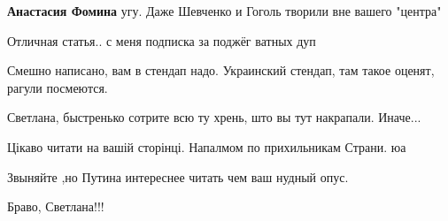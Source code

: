 \begin{itemize}
\begin{itemize}
\textbf{Анастасия Фомина} угу. Даже Шевченко и Гоголь творили вне вашего "центра"
\end{itemize}

 
Отличная статья.. с меня подписка за поджёг ватных дуп

 
Смешно написано, вам в стендап надо. Украинский стендап, там такое оценят, рагули посмеются.

 
Светлана, быстренько сотрите всю ту хрень, што вы тут накрапали. Иначе...

 

Цікаво читати на вашій сторінці.
Напалмом по прихильникам Страни. юа

 
Звыняйте ,но Путина интереснее читать чем ваш нудный опус.

 
Браво, Светлана!!!👏🏻👏🏻👏🏻


\end{itemize}
